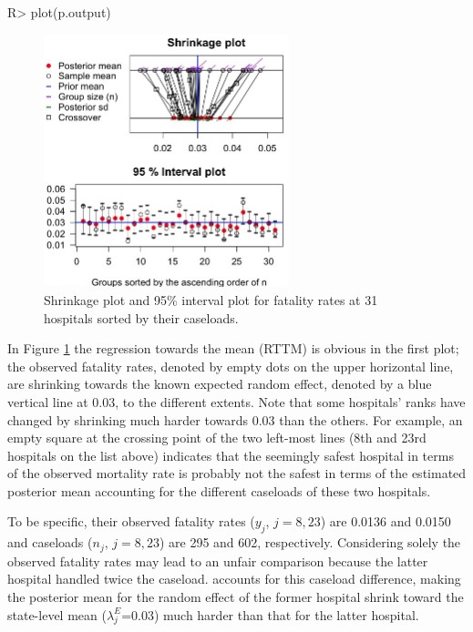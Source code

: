 \documentclass[article]{jss}
\begin{document}
\begin{CodeChunk}
\begin{CodeInput}
R> plot(p.output)
\end{CodeInput}
\end{CodeChunk}
\begin{figure}[h]
\begin{center}
\includegraphics[width = 2.8in]{hospital1.png}
\caption{Shrinkage plot and 95\% interval plot for fatality rates at 31 hospitals sorted by their caseloads.}
\label{fig:hospshr}
\end{center}
\end{figure}

In Figure \ref{fig:hospshr} the regression towards the mean (RTTM) is obvious in the first plot; the observed fatality rates, denoted by empty dots on the upper horizontal line, are shrinking towards the known expected random effect, denoted by a blue vertical line at 0.03, to the different extents. Note that some hospitals' ranks have changed by shrinking much harder towards 0.03 than the others. For example, an empty square at the crossing point of the two left-most lines (8th and 23rd hospitals on the list above) indicates that  the seemingly safest hospital in terms of the observed mortality rate is probably not the safest in terms of the estimated posterior mean accounting for the different caseloads of these two hospitals. 

To be specific, their observed fatality rates ($y_{j}$, $j=8, 23$) are 0.0136 and 0.0150 and caseloads ($n_{j}$, $j=8, 23$) are 295 and 602, respectively. Considering solely the observed fatality rates may lead to an unfair comparison because the latter hospital handled twice the caseload.  accounts for this caseload difference, making the posterior mean for the random effect of the former hospital shrink toward the state-level mean ($\lambda^E_j$=0.03) much harder than that for the latter hospital.
\end{document}
